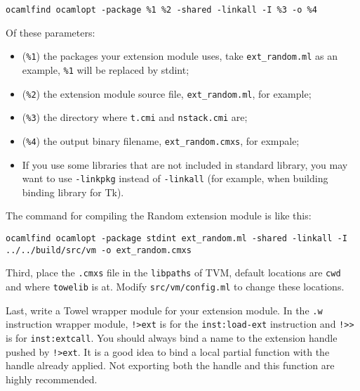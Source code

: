 \documentclass{article}
\newcommand{\inst}[1] {\texttt{inst:#1}}
\begin{document}
\texttt{ocamlfind ocamlopt -package \%1 \%2 -shared -linkall -I \%3 -o \%4}
\newline

Of these parameters:
\begin{itemize}
\item (\texttt{\%1}) the packages your extension module uses, take \texttt{ext\_random.ml} as an example, \texttt{\%1} will be replaced by stdint;
\item (\texttt{\%2}) the extension module source file, \texttt{ext\_random.ml}, for example;
\item (\texttt{\%3}) the directory where \texttt{t.cmi} and \texttt{nstack.cmi} are;
\item (\texttt{\%4}) the output binary filename, \texttt{ext\_random.cmxs}, for exmpale;
\item If you use some libraries that are not included in standard library, you may want to use \texttt{-linkpkg} instead of \texttt{-linkall} (for example, when building binding library for Tk).
\end{itemize}

The command for compiling the Random extension module is like this:\newline

\texttt{ocamlfind ocamlopt -package stdint ext\_random.ml -shared -linkall -I ../../build/src/vm -o ext\_random.cmxs}
\newline

Third, place the \texttt{.cmxs} file in the \texttt{libpaths} of TVM, default locations are \texttt{cwd} and where \texttt{towelib} is at. Modify \texttt{src/vm/config.ml} to change these locations.

Last, write a Towel wrapper module for your extension module. In the \texttt{.w} instruction wrapper module, \texttt{!>ext} is for the \inst{load-ext} instruction and \texttt{!>>} is for \inst{extcall}. You should always bind a name to the extension handle pushed by \texttt{!>ext}. It is a good idea to bind a local partial function with the handle already applied. Not exporting both the handle and this function are highly recommended.
\end{document}
